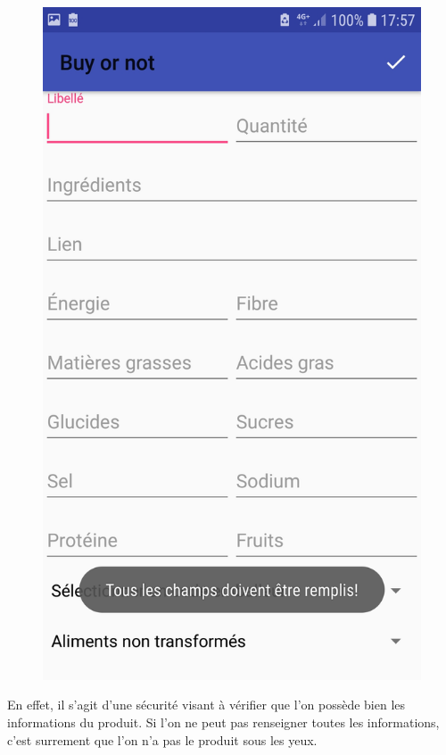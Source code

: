 \documentclass[report]{BetterDocument}
\begin{document}
	\begin{figure}[H]
		\centering\includegraphics[width=0.5\paperwidth, height=0.3\paperheight, keepaspectratio]{img/ajout_erreur.jpg}
	\end{figure}

	En effet, il s'agit d'une sécurité visant à vérifier que l'on possède bien les informations du produit. Si l'on ne peut pas renseigner toutes les informations, c'est surrement que l'on n'a pas le produit sous les yeux.
\end{document}
